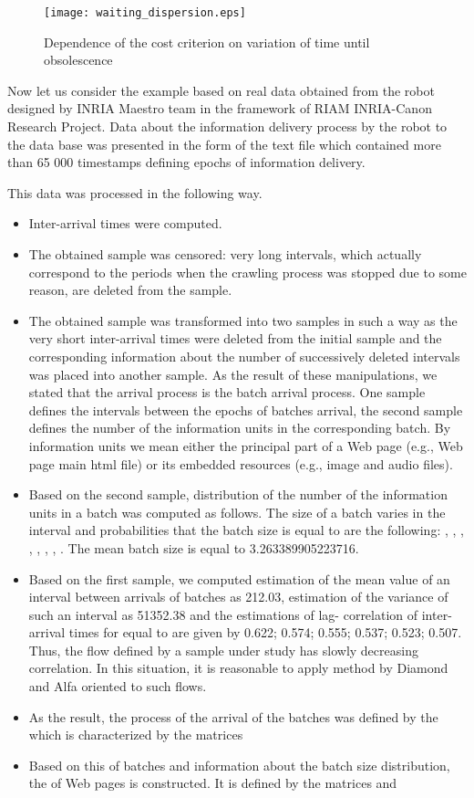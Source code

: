\documentclass[11pt]{article}
\begin{document}
\begin{figure}[htb]
\centering \texttt{[image: waiting\_dispersion.eps]}\\
  \caption{Dependence of the cost criterion on variation of time
until obsolescence}\label{fig:3.3}
\end{figure}

Now let us consider the example based on real data obtained from
the robot designed by INRIA Maestro team in the framework of RIAM
INRIA-Canon Research Project. Data about the information
delivery process by the robot to the data base was presented
in the form of the text file which contained more than 65 000
timestamps defining epochs of information delivery.

This data was
processed in the following way.
\begin{itemize}
\item[]
Inter-arrival times were computed.
\item[]
The obtained sample was censored: very long intervals, which
actually correspond to the periods when the crawling process was
stopped due to some reason, are deleted from the sample.
\item[]
The obtained sample was transformed into two samples in such a way
as the very short inter-arrival times were deleted from the initial
sample and the corresponding information about the number of
successively deleted intervals was placed into another sample. As
the result of these manipulations, we stated that the arrival
process is the batch arrival process. One sample defines the
intervals between the epochs of batches arrival, the second sample
defines the number of the information units in the corresponding
batch. By information units we mean either the principal part of
a Web page (e.g., Web page main html file) or its embedded resources
(e.g., image and audio files).
\item[]
Based on the second sample, distribution of the number of the
information units in a batch was computed as follows. The size of a
batch varies in the interval  and probabilities  that
the batch size is equal to  are the following:
, , ,
, , , , . The mean batch size
is equal to
 3.263389905223716.
 \item[]
 Based on the first sample, we computed estimation of the mean value of an interval between
 arrivals of batches as 212.03,
estimation of the variance of such an interval as 51352.38 and the
estimations of lag- correlation of inter-arrival times for 
equal to  are given by  0.622;  0.574; 0.555; 0.537;
0.523; 0.507. Thus, the flow defined by a sample under study has
slowly decreasing correlation. In this situation, it is reasonable
to apply method by Diamond and Alfa \cite{da} oriented to such flows.
 \item[]
 As the result, the process of the arrival of the batches was
 defined by the  which is characterized by the matrices
 
\item[]
Based on this  of batches and information about the batch size
distribution, the  of Web pages is constructed. It is defined
by the matrices  and 
\end{itemize}
\end{document}
